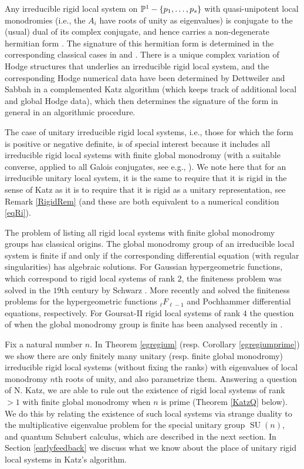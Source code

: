 \documentclass[11pt]{amsart}
\newcommand\op{\operatorname}
\numberwithin{theorem}{subsection}
\begin{document}
Any irreducible rigid local system on $\Bbb{P}^1-\{p_1,\dots,p_s\}$ with quasi-unipotent local monodromies (i.e., the $A_i$ have roots of unity as eigenvalues)  is conjugate to the (usual) dual of its complex conjugate, and hence carries a non-degenerate hermitian form
\cite[Section 9.5] {Katz}. The signature of this hermitian form  is determined  in the corresponding classical cases in \cite{BH} and \cite{Haraoka}. There is a unique complex variation of Hodge structures that underlies an irreducible rigid local system, and the corresponding Hodge numerical data have been determined by Dettweiler and Sabbah \cite{DS} in a complemented Katz algorithm (which keeps track of additional local and global Hodge data), which then determines the signature of the form in general in an algorithmic procedure.

The case of unitary irreducible rigid local systems, i.e., those for which the form is positive or negative definite, is of special interest because it includes all irreducible rigid local systems with finite global monodromy (with a suitable converse, applied to all Galois conjugates, see e.g., \cite[Theorem 11]{BLocal}). We note here that for an irreducible unitary local system, it is the same to require that it is rigid in the sense of Katz as it is to require that it is rigid as a unitary representation, see Remark \ref{RigidRem} (and these are both equivalent to a numerical condition \eqref{eqRi}).

The problem of listing all rigid local systems with finite  global monodromy groups has classical origins. The global monodromy group of an irreducible local system is finite  if and only if  the corresponding differential equation (with regular singularities) has algebraic solutions. For  Gaussian hypergeometric functions, which correspond to rigid local systems of rank $2$, the finiteness problem was solved in the $19$th century by Schwarz \cite{Schwarz}. More recently \cite{BH} and \cite{Haraoka} solved the finiteness problems for  the hypergeometric functions  ${}_{\ell}F_{\ell-1}$ and Pochhammer differential equations, respectively. For Goursat-II rigid local systems \cite{EGoursat} of rank $4$ the question of when the global monodromy group is finite has been analysed recently in \cite{Goursat}.

Fix a natural number $n$. In Theorem \ref{egregium} (resp. Corollary \ref{egregiumprime}) we show there are only finitely many unitary (resp. finite global monodromy) irreducible rigid local systems (without fixing the ranks) with eigenvalues of local monodromy $n$th roots of unity, and also parametrize them. Answering a question of N. Katz, we are able to rule out the existence of rigid local systems of rank $>1$ with  finite global monodromy when $n$ is prime (Theorem \ref{KatzQ} below). We do this by relating the existence of such local systems via strange duality to the multiplicative eigenvalue problem for the special unitary group $\op{SU}(n)$, and quantum Schubert calculus, which are described in the next section. In Section
\ref{earlyfeedback}  we discuss what we know about the place of unitary rigid local systems in Katz's algorithm.
\end{document}
